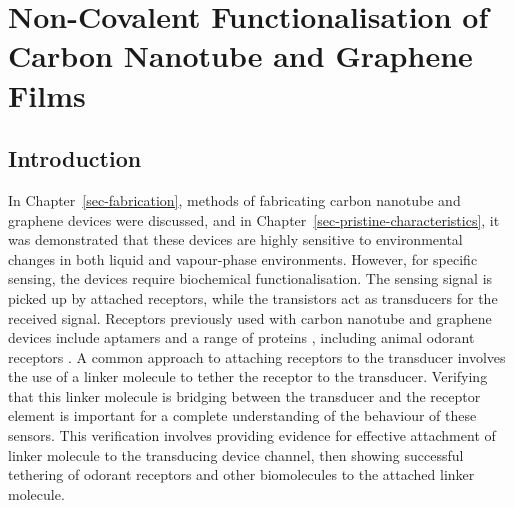 \documentclass[
  a4paper,
]{scrbook}
\begin{document}

\hypertarget{sec-noncovalent-functionalisation}{%
\chapter{Non-Covalent Functionalisation of Carbon Nanotube and Graphene
Films}\label{sec-noncovalent-functionalisation}}

\hypertarget{introduction-4}{%
\section{Introduction}\label{introduction-4}}

In Chapter~\ref{sec-fabrication}, methods of fabricating carbon nanotube
and graphene devices were discussed, and in
Chapter~\ref{sec-pristine-characteristics}, it was demonstrated that
these devices are highly sensitive to environmental changes in both
liquid and vapour-phase environments. However, for specific sensing, the
devices require biochemical functionalisation. The sensing signal is
picked up by attached receptors, while the transistors act as
transducers for the received signal. Receptors previously used with
carbon nanotube and graphene devices include aptamers
\autocite{Khan2021,Nguyen2021,Shkodra2021,Nekrasov2021,Mishyn2022,Cassie2023}
and a range of proteins \autocite{Lerner2014,Ahn2020,Tong2020,Wang2020},
including animal odorant receptors
\autocite{Goldsmith2011,Lee2018,Murugathas2019a,Murugathas2020,Moon2020,Yoo2022}.
A common approach to attaching receptors to the transducer involves the
use of a linker molecule to tether the receptor to the transducer.
Verifying that this linker molecule is bridging between the transducer
and the receptor element is important for a complete understanding of
the behaviour of these sensors. This verification involves providing
evidence for effective attachment of linker molecule to the transducing
device channel, then showing successful tethering of odorant receptors
and other biomolecules to the attached linker molecule.
\end{document}
